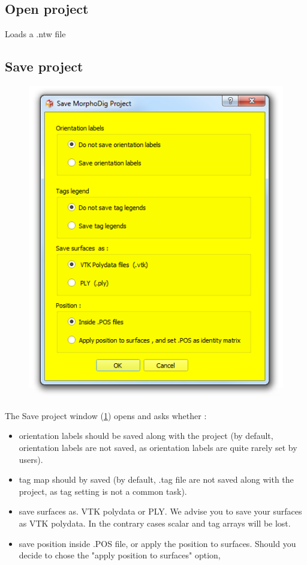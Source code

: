 \subsection{Open project}
Loads a .ntw file

\subsection{Save project}
\begin{figure}
  \centering  
 \includegraphics[scale=0.5]{images/07/project/save_ntw.png}
\label{save_project_file}
\end{figure}
The Save project window (\ref{save_project_file}) opens and asks whether :  
\begin{itemize}
\item orientation labels should be saved along with the project (by default, orientation labels are not saved, as orientation labels are quite rarely set by users). 
\item tag map should by saved (by default, .tag file are not saved along with the project, as tag setting is not a common task). 
\item save surfaces as. VTK polydata or PLY. We advise you to save your surfaces as VTK polydata. In the contrary cases scalar and tag arrays will be lost.
\item save position inside .POS file, or apply the position to surfaces. Should you decide to chose the "apply position to surfaces" option, 
\end{itemize}

